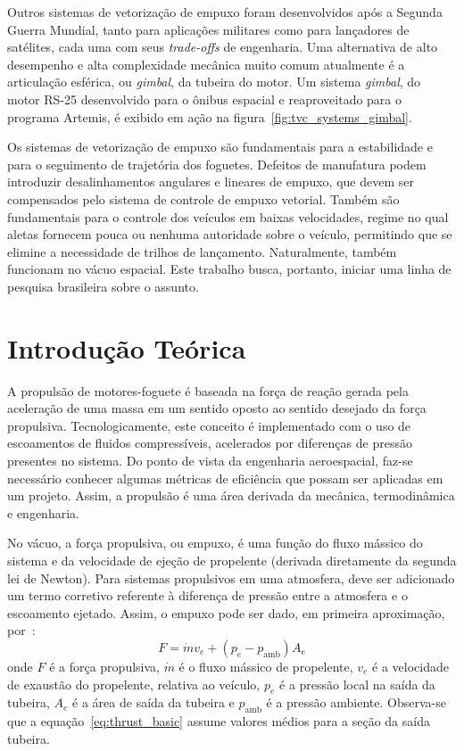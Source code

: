 Outros sistemas de vetorização de empuxo foram desenvolvidos após a Segunda Guerra Mundial, tanto para aplicações militares como para lançadores de satélites, cada uma com seus \textit{trade-offs} de engenharia. Uma alternativa de alto desempenho e alta complexidade mecânica muito comum atualmente é a articulação esférica, ou \textit{gimbal}, da tubeira do motor. Um sistema \textit{gimbal}, do motor RS-25 desenvolvido para o ônibus espacial e reaproveitado para o programa Artemis, é exibido em ação na figura~\ref{fig:tvc_systems_gimbal}.

Os sistemas de vetorização de empuxo são fundamentais para a estabilidade e para o seguimento de trajetória dos foguetes. Defeitos de manufatura podem introduzir desalinhamentos angulares e lineares de empuxo, que devem ser compensados pelo sistema de controle de empuxo vetorial. Também são fundamentais para o controle dos veículos em baixas velocidades, regime no qual aletas fornecem pouca ou nenhuma autoridade sobre o veículo, permitindo que se elimine a necessidade de trilhos de lançamento. Naturalmente, também funcionam no vácuo espacial. Este trabalho busca, portanto, iniciar uma linha de pesquisa brasileira sobre o assunto.

\section{Introdução Teórica}\label{sec:intro}
A propulsão de motores-foguete é baseada na força de reação gerada pela aceleração de uma massa em um sentido oposto ao sentido desejado da força propulsiva. Tecnologicamente, este conceito é implementado com o uso de escoamentos de fluidos compressíveis, acelerados por diferenças de pressão presentes no sistema. Do ponto de vista da engenharia aeroespacial, faz-se necessário conhecer algumas métricas de eficiência que possam ser aplicadas em um projeto. Assim, a propulsão é uma área derivada da mecânica, termodinâmica e engenharia.

No vácuo, a força propulsiva, ou empuxo, é uma função do fluxo mássico do sistema e da velocidade de ejeção de propelente (derivada diretamente da segunda lei de Newton). Para sistemas propulsivos em uma atmosfera, deve ser adicionado um termo corretivo referente à diferença de pressão entre a atmosfera e o escoamento ejetado. Assim, o empuxo pode ser dado, em primeira aproximação, por~\cite{Sutton}:
\begin{equation}
    \label{eq:thrust_basic}
    F = \dot{m} v_e + (p_e - p_{\mathrm{amb}}) A_e
\end{equation}
onde \(F\) é a força propulsiva, \(\dot{m}\) é o fluxo mássico de propelente, \(v_e\) é a velocidade de exaustão do propelente, relativa ao veículo, \(p_e\) é a pressão local na saída da tubeira, \(A_e\) é a área de saída da tubeira e \(p_{\mathrm{amb}}\) é a pressão ambiente. Observa-se que a equação~\ref{eq:thrust_basic} assume valores médios para a seção da saída tubeira.

